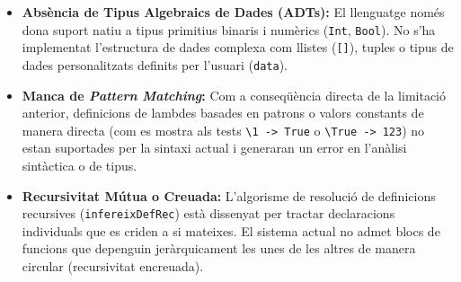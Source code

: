 \begin{itemize}
    \item \textbf{Absència de Tipus Algebraics de Dades (ADTs):} El llenguatge només dona suport natiu a tipus primitius binaris i numèrics (\texttt{Int}, \texttt{Bool}). No s'ha implementat l'estructura de dades complexa com llistes (\texttt{[]}), tuples o tipus de dades personalitzats definits per l'usuari (\texttt{data}).
    \item \textbf{Manca de \emph{Pattern Matching}:} Com a conseqüència directa de la limitació anterior, definicions de lambdes basades en patrons o valors constants de manera directa (com es mostra als tests \texttt{\textbackslash 1 -> True} o \texttt{\textbackslash True -> 123}) no estan suportades per la sintaxi actual i generaran un error en l'anàlisi sintàctica o de tipus.
    \item \textbf{Recursivitat Mútua o Creuada:} L'algorisme de resolució de definicions recursives (\texttt{infereixDefRec}) està dissenyat per tractar declaracions individuals que es criden a si mateixes. El sistema actual no admet blocs de funcions que depenguin jeràrquicament les unes de les altres de manera circular (recursivitat encreuada).
\end{itemize}